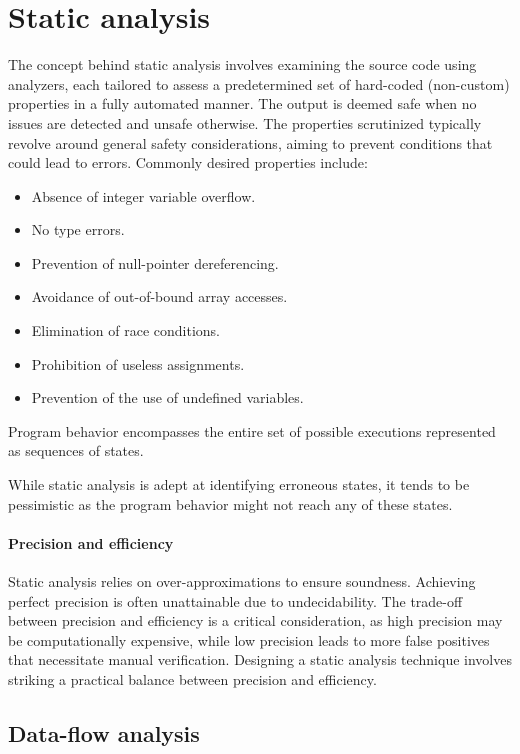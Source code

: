 \section{Static analysis}

The concept behind static analysis involves examining the source code using analyzers, each tailored to assess a predetermined set of hard-coded (non-custom) properties in a fully automated manner.
The output is deemed safe when no issues are detected and unsafe otherwise.
The properties scrutinized typically revolve around general safety considerations, aiming to prevent conditions that could lead to errors. 
Commonly desired properties include:
\begin{itemize}
    \item Absence of integer variable overflow.
    \item No type errors.
    \item Prevention of null-pointer dereferencing.
    \item Avoidance of out-of-bound array accesses.
    \item Elimination of race conditions.
    \item Prohibition of useless assignments.
    \item Prevention of the use of undefined variables.
\end{itemize}
\begin{definition}
    Program behavior encompasses the entire set of possible executions represented as sequences of states.
\end{definition}
While static analysis is adept at identifying erroneous states, it tends to be pessimistic as the program behavior might not reach any of these states.

\paragraph*{Precision and efficiency}
Static analysis relies on over-approximations to ensure soundness. 
Achieving perfect precision is often unattainable due to undecidability.
The trade-off between precision and efficiency is a critical consideration, as high precision may be computationally expensive, while low precision leads to more false positives that necessitate manual verification.
Designing a static analysis technique involves striking a practical balance between precision and efficiency.

\subsection{Data-flow analysis}
